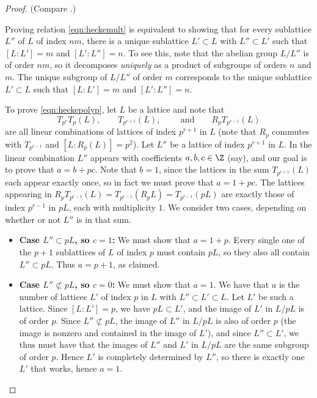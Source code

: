 \documentclass{report}
\begin{document}
\begin{proof}
(Compare \cite[Cor.~1, pg.~99]{serre:arithmetic}.)

Proving relation \eqref{eqn:heckemult} is equivalent to showing that
for every sublattice $L''$ of $L$ of index $nm$, there is a unique
sublattice $L'\subset L$ with $L''\subset L'$ such that $[L:L']=m$ and
$[L':L'']=n$. To see this, note that the abelian group $L/L''$ is of
order $nm$, so it decomposes {\em uniquely} as a product of subgroups
of orders $n$ and $m$.  The unique subgroup of $L/L''$ of order $m$
corresponds to the unique sublattice $L'\subset L$ such that
$[L:L']=m$ and $[L':L'']=n$.

To prove \eqref{eqn:heckepolyp}, let $L$ be a lattice and note that
$$T_{p^r} T_p(L), \qquad T_{p^{r+1}}(L),\qquad\text{ and}\qquad R_p T_{p^{r-1}}(L)$$
are all linear combinations of lattices of index $p^{r+1}$ in $L$
(note that $R_p$ commutes with $T_{p^{r-1}}$ and $[L:R_p(L)]=p^2$).
Let $L''$ be a lattice of index $p^{r+1}$ in $L$.  In the linear
combination $L''$ appears with coefficients $a,b,c\in\Z$ (say), and
our goal is to prove that $a = b+pc$.  Note that $b=1$, since the
lattices in the sum $T_{p^{r+1}}(L)$ each appear exactly once, so in
fact we must prove that $a = 1 + pc$.  The lattices appearing in $R_p
T_{p^{r-1}}(L) = T_{p^{r-1}}(R_pL) = T_{p^{r-1}}(pL)$ are exactly
those of index $p^{r-1}$ in $pL$, each with multiplicity $1$.  We
consider two cases, depending on whether or not $L''$ is in that sum.
\begin{itemize}
\item {\bf Case $L''\subset pL$, so $c=1$:} We must show that $a=1+p$.
Every single one of the $p+1$ sublattices of $L$ of index $p$ must contain
$pL$, so they also all contain $L''\subset pL$.  Thus $a=p+1$, as claimed.

\item {\bf Case $L''\not\subset pL$, so $c=0$:} We must show that $a=1$.
We have that $a$ is the number of lattices $L'$ of index $p$ in $L$
with $L''\subset L'\subset L$.
Let $L'$ be such a lattice.  Since $[L:L']=p$, we have $pL\subset L'$,
and the image of $L'$ in $L/pL$ is of order $p$.
Since $L''\not\subset pL$, the image of $L''$ in
$L/pL$ is also of order $p$ (the image is nonzero and contained
in the image of $L'$), and since $L''\subset L'$, we thus
must have that the images of $L''$ and $L'$ in $L/pL$ are the same
subgroup of order $p$.  Hence $L'$ is completely determined by $L''$,
so there is exactly one $L'$ that works, hence $a=1$.
\end{itemize}


\end{proof}
\end{document}
